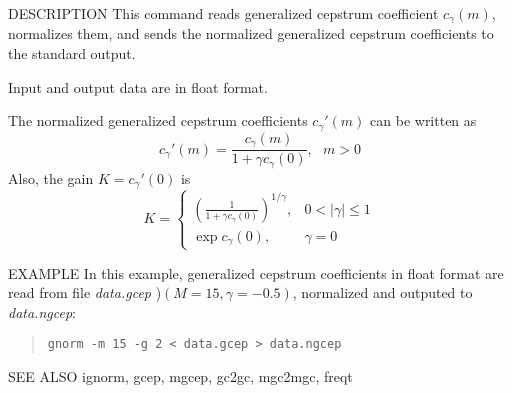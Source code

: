 \begin{qsection}{DESCRIPTION}
This command reads generalized cepstrum coefficient $c_\gamma(m)$,
normalizes them, and sends the normalized generalized
cepstrum coefficients to the standard output.
\par
Input and output data are in float format.
\par
The normalized generalized cepstrum coefficients $c_\gamma'(m)$
can be written as
\begin{displaymath}
c_\gamma'(m) = \frac{c_\gamma(m)}{1+\gamma c_\gamma(0)}, ~~~m>0
\end{displaymath}
Also, the gain $K = c_\gamma'(0)$ is
\begin{displaymath}
K = \left\{
	\begin{array}{ll} \displaystyle
	  \left(\frac{1}{1+\gamma c_\gamma(0)}\right)^{1/\gamma},
		& 0<|\gamma|\leq 1 \\ \displaystyle
	  \exp c_\gamma(0),  & \gamma=0
	\end{array} \right.
\end{displaymath}
\end{qsection}

\begin{options}
\end{options}

\begin{qsection}{EXAMPLE}
In this example, generalized cepstrum coefficients in float format
are read from file {\em data.gcep} )$(M=15, \gamma=-0.5)$,
normalized and outputed to {\em data.ngcep}:
\begin{quote}
 \verb!gnorm -m 15 -g 2 < data.gcep > data.ngcep!
\end{quote} 
\end{qsection}

\begin{qsection}{SEE ALSO}
 ignorm, gcep, mgcep, gc2gc, mgc2mgc, freqt
\end{qsection}
